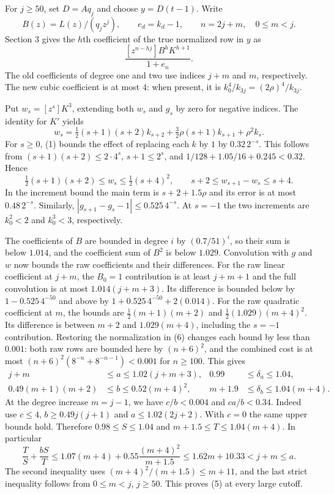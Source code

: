 \documentclass[11pt]{article}
\begin{document}
For \(j\ge50\), set \(D=Aq_j\) and choose \(y=D(t-1)\). Write
\[
B(z)=L(z)/(q_jz^j),\qquad e_d=k_d-1,\qquad n=2j+m,\quad 0\le m<j .
\]
Section 3 gives the \(h\)th coefficient of the true normalized row in \(y\) as
\[
\frac{[z^{n-hj}]B^hK^{h+1}}{1+e_n}.
\tag{6}
\]
The old coefficients of degree one and two use indices \(j+m\) and \(m\), respectively. The new cubic coefficient is at most \(4\): when present, it is \(k_0^4/k_{3j}=(2\rho)^4/k_{3j}\).

Put \(w_s=[z^s]K^3\), extending both \(w_s\) and \(g_s\) by zero for negative indices. The identity for \(K'\) yields
\[
w_s=\tfrac12(s+1)(s+2)k_{s+2}
     +\tfrac32\rho(s+1)k_{s+1}+\rho^2 k_s.
\]
For \(s\ge0\), (1) bounds the effect of replacing each \(k\) by \(1\) by \(0.32\,2^{-s}\). This follows from \((s+1)(s+2)\le2\cdot4^s\), \(s+1\le2^s\), and \(1/128+1.05/16+0.245<0.32\). Hence
\[
\tfrac12(s+1)(s+2)\le w_s\le\tfrac12(s+4)^2,\qquad
s+2\le w_{s+1}-w_s\le s+4.
\]
In the increment bound the main term is \(s+2+1.5\rho\) and its error is at most \(0.48\,2^{-s}\). Similarly, \(|g_{s+1}-g_s-1|\le0.525\,4^{-s}\). At \(s=-1\) the two increments are \(k_0^2<2\) and \(k_0^3<3\), respectively.

The coefficients of \(B\) are bounded in degree \(i\) by \((0.7/51)^i\), so their sum is below \(1.014\), and the coefficient sum of \(B^2\) is below \(1.029\). Convolution with \(g\) and \(w\) now bounds the raw coefficients and their differences. For the raw linear coefficient at \(j+m\), the \(B_0=1\) contribution is at least \(j+m+1\) and the full convolution is at most \(1.014(j+m+3)\). Its difference is bounded below by \(1-0.525\,4^{-50}\) and above by \(1+0.525\,4^{-50}+2(0.014)\). For the raw quadratic coefficient at \(m\), the bounds are \(\tfrac12(m+1)(m+2)\) and \(\tfrac12(1.029)(m+4)^2\). Its difference is between \(m+2\) and \(1.029(m+4)\), including the \(s=-1\) contribution. Restoring the normalization in (6) changes each bound by less than \(0.001\): both raw rows are bounded here by \((n+6)^2\), and the combined cost is at most \((n+6)^2(8^{-n}+8^{-n-1})<0.001\) for \(n\ge100\). This gives
\[
\begin{aligned}
j+m&\le a\le1.02(j+m+3),&
0.99&\le\delta_a\le1.04,\\
0.49(m+1)(m+2)&\le b\le0.52(m+4)^2,&
m+1.9&\le\delta_b\le1.04(m+4).
\end{aligned}
\]
At the degree increase \(m=j-1\), we have \(c/b<0.004\) and \(ca/b<0.34\). Indeed use \(c\le4\), \(b\ge0.49j(j+1)\) and \(a\le1.02(2j+2)\). With \(c=0\) the same upper bounds hold. Therefore \(0.98\le S\le1.04\) and \(m+1.5\le T\le1.04(m+4)\). In particular
\[
\frac{T}{S}+\frac{bS}{T}
\le1.07(m+4)+0.55\frac{(m+4)^2}{m+1.5}
\le1.62m+10.33<j+m\le a .
\]
The second inequality uses \((m+4)^2/(m+1.5)\le m+11\), and the last strict inequality follows from \(0\le m<j\), \(j\ge50\). This proves (5) at every large cutoff.
\end{document}
